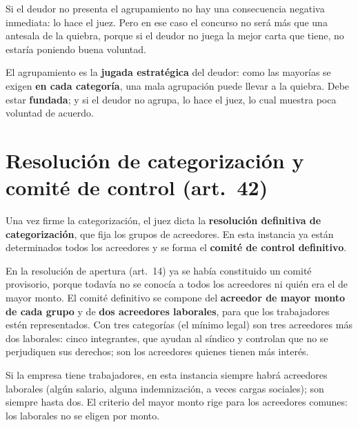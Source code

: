 \documentclass[12pt,oneside]{book}
\begin{document}
Si el deudor no presenta el agrupamiento no hay una consecuencia negativa inmediata: lo hace el juez. Pero en ese caso el concurso no será más que una antesala de la quiebra, porque si el deudor no juega la mejor carta que tiene, no estaría poniendo buena voluntad.

\begin{important}
El agrupamiento es la \textbf{jugada estratégica} del deudor: como las mayorías se exigen \textbf{en cada categoría}, una mala agrupación puede llevar a la quiebra. Debe estar \textbf{fundada}; y si el deudor no agrupa, lo hace el juez, lo cual muestra poca voluntad de acuerdo.
\end{important}

\section{Resolución de categorización y comité de control (art.\ 42)}

Una vez firme la categorización, el juez dicta la \textbf{resolución definitiva de categorización}, que fija los grupos de acreedores. En esta instancia ya están determinados todos los acreedores y se forma el \textbf{comité de control definitivo}.

En la resolución de apertura (art.\ 14) ya se había constituido un comité provisorio, porque todavía no se conocía a todos los acreedores ni quién era el de mayor monto. El comité definitivo se compone del \textbf{acreedor de mayor monto de cada grupo} y de \textbf{dos acreedores laborales}, para que los trabajadores estén representados. Con tres categorías (el mínimo legal) son tres acreedores más dos laborales: cinco integrantes, que ayudan al síndico y controlan que no se perjudiquen sus derechos; son los acreedores quienes tienen más interés.

Si la empresa tiene trabajadores, en esta instancia siempre habrá acreedores laborales (algún salario, alguna indemnización, a veces cargas sociales); son siempre hasta dos. El criterio del mayor monto rige para los acreedores comunes: los laborales no se eligen por monto.
\end{document}

